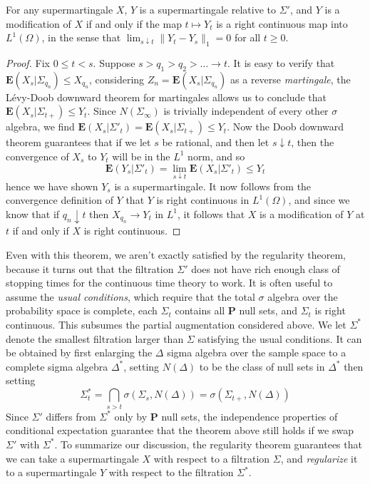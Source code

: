 \begin{theorem}
    For any supermartingale $X$, $Y$ is a supermartingale relative to $\Sigma'$, and $Y$ is a modification of $X$ if and only if the map $t \mapsto Y_t$ is a right continuous map into $L^1(\Omega)$, in the sense that $\lim_{s \downarrow t} \| Y_t - Y_s \|_1 = 0$ for all $t \geq 0$.
\end{theorem}
\begin{proof}
    Fix $0 \leq t < s$. Suppose $s > q_1 > q_2 > \dots \to t$. It is easy to verify that $\mathbf{E}(X_s|\Sigma_{q_n}) \leq X_{q_n}$, considering $Z_n = \mathbf{E}(X_s|\Sigma_{q_n})$ as a reverse {\it martingale}, the L\'{e}vy-Doob downward theorem for martingales allows us to conclude that $\mathbf{E}(X_s|\Sigma_{t+}) \leq Y_t$. Since $N(\Sigma_\infty)$ is trivially independent of every other $\sigma$ algebra, we find $\mathbf{E}(X_s|\Sigma'_t) = \mathbf{E}(X_s|\Sigma_{t+}) \leq Y_t$. Now the Doob downward theorem guarantees that if we let $s$ be rational, and then let $s \downarrow t$, then the convergence of $X_s$ to $Y_t$ will be in the $L^1$ norm, and so
    \[ \mathbf{E}(Y_s|\Sigma'_t) = \lim_{s \downarrow t} \mathbf{E}(X_s|\Sigma'_t) \leq Y_t \]
    hence we have shown $Y_s$ is a supermartingale. It now follows from the convergence definition of $Y$ that $Y$ is right continuous in $L^1(\Omega)$, and since we know that if $q_n \downarrow t$ then $X_{q_n} \to Y_t$ in $L^1$, it follows that $X$ is a modification of $Y$ at $t$ if and only if $X$ is right continuous.
\end{proof}

Even with this theorem, we aren't exactly satisfied by the regularity theorem, because it turns out that the filtration $\Sigma'$ does not have rich enough class of stopping times for the continuous time theory to work. It is often useful to assume the {\it usual conditions}, which require that the total $\sigma$ algebra over the probability space is complete, each $\Sigma_t$ contains all $\mathbf{P}$ null sets, and $\Sigma_t$ is right continuous. This subsumes the partial augmentation considered above. We let $\Sigma^*$ denote the smallest filtration larger than $\Sigma$ satisfying the usual conditions. It can be obtained by first enlarging the $\Delta$ sigma algebra over the sample space to a complete sigma algebra $\Delta^*$, setting $N(\Delta)$ to be the class of null sets in $\Delta^*$ then setting
%
\[ \Sigma^*_t = \bigcap_{s > t} \sigma(\Sigma_s, N(\Delta)) = \sigma(\Sigma_{t+}, N(\Delta)) \]
%
Since $\Sigma'$ differs from $\Sigma^*$ only by $\mathbf{P}$ null sets, the independence properties of conditional expectation guarantee that the theorem above still holds if we swap $\Sigma'$ with $\Sigma^*$. To summarize our discussion, the regularity theorem guarantees that we can take a supermartingale $X$ with respect to a filtration $\Sigma$, and {\it regularize} it to a \cadlag supermartingale $Y$ with respect to the filtration $\Sigma^*$.

